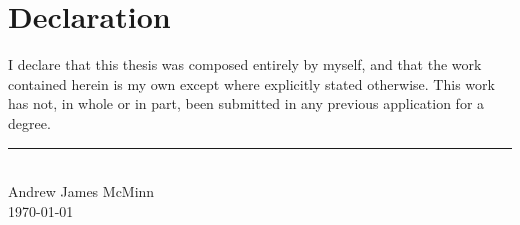 
\chapter*{Declaration}
\thispagestyle{empty}

I declare that this thesis was composed entirely by myself, and that the work contained herein is my own except where explicitly stated otherwise. This work has not, in whole or in part, been submitted in any previous application for a degree.
\bigskip

\smallskip

\begin{flushright}
\noindent\rule{7cm}{0.4pt} \\
Andrew James McMinn\\ \today \\
\end{flushright}
